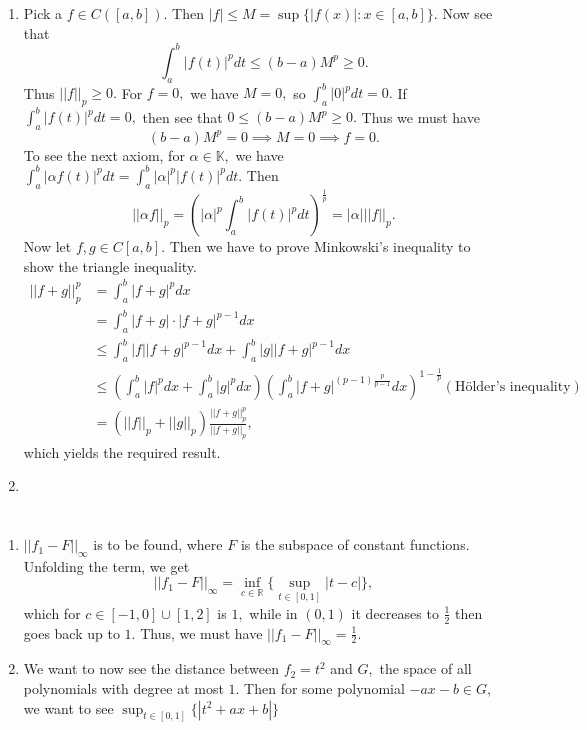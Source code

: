 \documentclass{article}
\begin{document}
\section{} %
\begin{enumerate}
	\item Pick a $f \in C([a,b]).$ Then $|f|\leq M=\sup\{|f(x)|:x \in [a,b]\}.$ Now see that $$\int_a^b|f(t)|^pdt \leq (b-a)M^p \geq 0.$$ Thus $||f||_p \geq 
	0.$
	For $f=0,$ we have $M=0,$ so $\int_a^b|0|^pdt=0.$ If $\int_a^b|f(t)|^pdt =0,$ then see that $0 \leq (b-a)M^p \geq 0.$ Thus we must have $$(b-a)M^p=0 
	\implies M=0 \implies f=0.$$ To see the next axiom, for $\alpha \in \mathbb{K},$ we have $\int_a^b|\alpha f(t)|^pdt =\int_a^b|\alpha|^p|f(t)|^pdt.$
	Then $$||\alpha f||_p= \left(|\alpha|^p\int_a^b|f(t)|^pdt\right)^{\frac{1}{p}} =|\alpha| ||f||_p.$$
	Now let $f,g \in C[a,b].$ Then we have to prove Minkowski's inequality to show the triangle inequality. 
	\begin{align*}
		||f+g||^p_p &= \int_{a}^b |f+g|^p dx\\
		&= \int_{a}^b |f+g|\cdot|f+g|^{p-1} dx\\
		&\leq \int_{a}^b |f||f+g|^{p-1} dx + \int_{a}^b |g||f+g|^{p-1} dx\\
		&\leq \left(\int_{a}^b |f|^{p} dx+\int_{a}^b |g|^{p} dx\right)\left(\int_{a}^b |f+g|^{(p-1)\frac{p}{p-1}} dx \right)^{1-\frac{1}{p}} 
		(\text{H\"{o}lder's inequality})\\
		&= (||f||_p+||g||_p)\frac{||f+g||_p^p}{||f+g||_p},
	\end{align*}
	which yields the required result.
	\item 

\end{enumerate}
\section{} %
\begin{enumerate}
	\item $||f_1-F||_{\infty}$ is to be found, where $F$ is the subspace of constant functions. Unfolding the term, we get 
	$$||f_1-F||_{\infty}= \inf_{c \in \mathbb{R} }\{ \sup_{t \in [0,1]} |t-c|  \},$$ which for $c \in [-1,0] \cup [1,2] $ is $1,$ while in $(0,1)$ it 
	decreases to $\frac{1}{2}$ then goes back up to $1.$ Thus, we must have $||f_1-F||_{\infty}=\frac{1}{2}.$
	\item We want to now see the distance between $f_2=t^2$ and $G,$ the space of all polynomials with degree at most $1.$ Then for some polynomial $-ax-b 
	\in G,$ we want to see $\sup_{t \in [0,1]}\{|t^2+ax+b|\}$ 
\end{enumerate}
\end{document}
